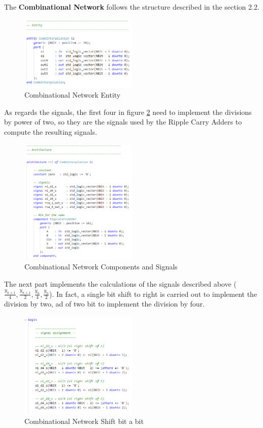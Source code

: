 The \textbf{Combinational Network} follows the structure described in the section 2.2.

\begin{figure}[H]
    \centering
    \includegraphics[width=0.5\textwidth]{img/Chapter3/CombInterp-entity.png}
    \caption{Combinational Network Entity}
    \label{fig:CNE}
\end{figure}

As regards the signals, the first four in figure \ref{fig:CNA1} need to implement the divisions by power of two, so they are the signals used by the Ripple Carry Adders to compute the resulting signals.

\begin{figure}[H]
    \centering
    \includegraphics[width=0.5\textwidth]{img/Chapter3/CombInterp-architecture.png}
    \caption{Combinational Network Components and Signals}
    \label{fig:CNA1}
\end{figure}

The next part implements the calculations of the signals described above ($\frac{y_{n+1}}{4}, \frac{y_{n+1}}{2}, \frac{y_n}{4}, \frac{y_n}{2}$). In fact, a single bit shift to right is carried  out to implement the division by two, ad of two bit to implement the division by four.

\begin{figure}[H]
    \centering
    \includegraphics[width=0.5\textwidth]{img/Chapter3/CombInterp-shift.png}
    \caption{Combinational Network Shift bit a bit}
    \label{fig:CNA2}
\end{figure}

